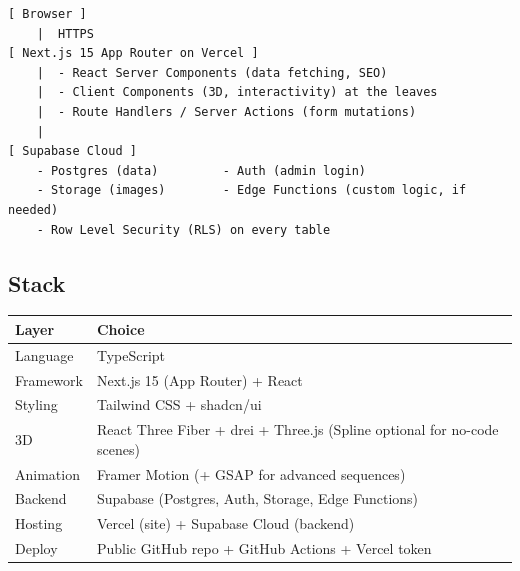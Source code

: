 \documentclass[11pt,a4paper]{article}
\begin{document}
\begin{lstlisting}
[ Browser ]
    |  HTTPS
[ Next.js 15 App Router on Vercel ]
    |  - React Server Components (data fetching, SEO)
    |  - Client Components (3D, interactivity) at the leaves
    |  - Route Handlers / Server Actions (form mutations)
    |
[ Supabase Cloud ]
    - Postgres (data)         - Auth (admin login)
    - Storage (images)        - Edge Functions (custom logic, if needed)
    - Row Level Security (RLS) on every table
\end{lstlisting}

\subsection{Stack}
\begin{center}
\begin{tabularx}{\textwidth}{l Y}
\toprule
\textbf{Layer} & \textbf{Choice}\\
\midrule
Language & TypeScript\\
Framework & Next.js 15 (App Router) + React\\
Styling & Tailwind CSS + shadcn/ui\\
3D & React Three Fiber + drei + Three.js (Spline optional for no-code scenes)\\
Animation & Framer Motion (+ GSAP for advanced sequences)\\
Backend & Supabase (Postgres, Auth, Storage, Edge Functions)\\
Hosting & Vercel (site) + Supabase Cloud (backend)\\
Deploy & Public GitHub repo + GitHub Actions + Vercel token\\
\bottomrule
\end{tabularx}
\end{center}

\end{document}

